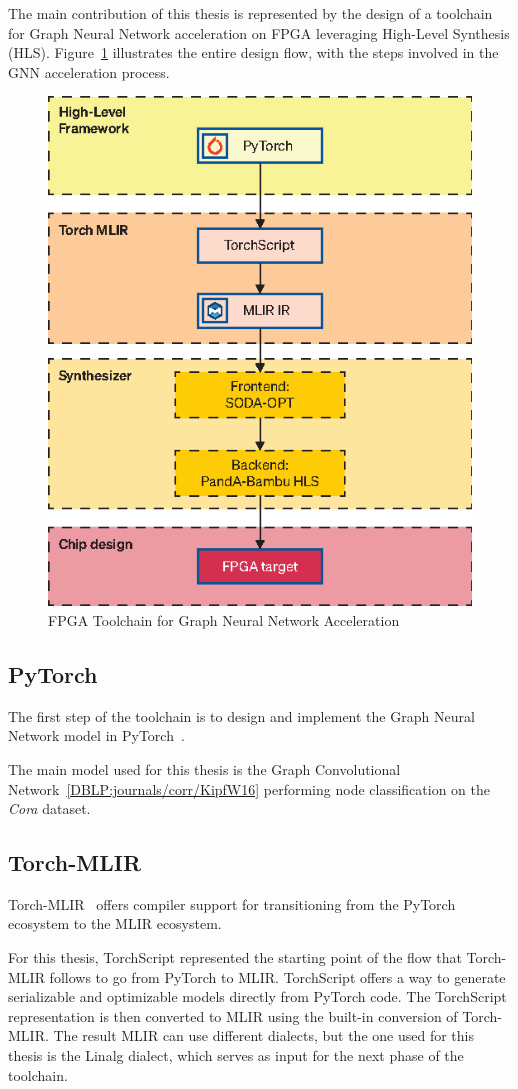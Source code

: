 \documentclass[11pt,a4paper,twocolumn]{article}
\begin{document}
The main contribution of this thesis is represented by the design of a toolchain for Graph Neural Network acceleration on FPGA leveraging High-Level Synthesis (HLS).
Figure~\ref{fig:toolchain} illustrates the entire design flow, with the steps involved in the GNN acceleration process.

\begin{figure}[t]
    \centering
    \includegraphics[height=0.36\textwidth]{Images/toolchain}
    \caption{FPGA Toolchain for Graph Neural Network Acceleration}
    \label{fig:toolchain}
\end{figure}

\subsection{PyTorch}
\label{subsec:pytorch-toolchain}%

The first step of the toolchain is to design and implement the Graph Neural Network model in PyTorch~\cite{DBLP:journals/corr/abs-1912-01703}.

The main model used for this thesis is the Graph Convolutional Network~\ref{DBLP:journals/corr/KipfW16} performing node classification on the \textit{Cora} dataset.

\subsection{Torch-MLIR}
\label{subsec:torch-mlir-toolchain}%

Torch-MLIR~\cite{torch_mlir} offers compiler support for transitioning from the PyTorch ecosystem to the MLIR ecosystem.

For this thesis, TorchScript represented the starting point of the flow that Torch-MLIR follows to go from PyTorch to MLIR\@.
TorchScript offers a way to generate serializable and optimizable models directly from PyTorch code.
The TorchScript representation is then converted to MLIR using the built-in conversion of Torch-MLIR.
The result MLIR can use different dialects, but the one used for this thesis is the Linalg dialect, which serves as input for the next phase of the toolchain.
\end{document}
